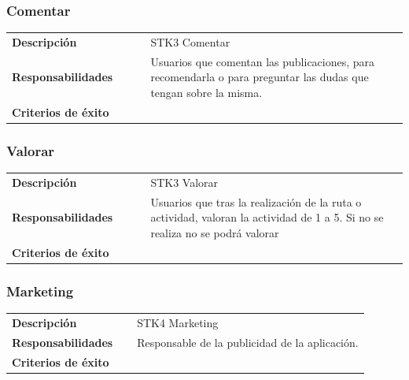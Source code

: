 \documentclass[11pt]{article}
\begin{document}
\subsubsection{Comentar}
\begin{table}[H]
  \centering
  \begin{tabular}{p{0.35\linewidth}|p{0.65\linewidth}}
    \toprule
    \textbf{Descripción} & STK3 Comentar\\
    \textbf{Responsabilidades} & Usuarios que comentan las publicaciones, para recomendarla o para preguntar las dudas que tengan sobre la misma.\\
    \textbf{Criterios de éxito} &  \\
    \bottomrule
  \end{tabular}
\end{table}

\subsubsection{Valorar}
\begin{table}[H]
  \centering
  \begin{tabular}{p{0.35\linewidth}|p{0.65\linewidth}}
    \toprule
    \textbf{Descripción} & STK3 Valorar\\
    \textbf{Responsabilidades} & Usuarios que tras la realización de la ruta o actividad, valoran la actividad de 1 a 5. Si no se realiza no se podrá valorar\\
    \textbf{Criterios de éxito} &  \\
    \bottomrule
  \end{tabular}
\end{table}

\subsubsection{Marketing}
\begin{table}[H]
  \centering
  \begin{tabular}{p{0.35\linewidth}|p{0.65\linewidth}}
    \toprule
    \textbf{Descripción} & STK4 Marketing\\
    \textbf{Responsabilidades} & Responsable de la publicidad de la aplicación.\\
    \textbf{Criterios de éxito} &  \\
    \bottomrule
  \end{tabular}
\end{table}
\end{document}
